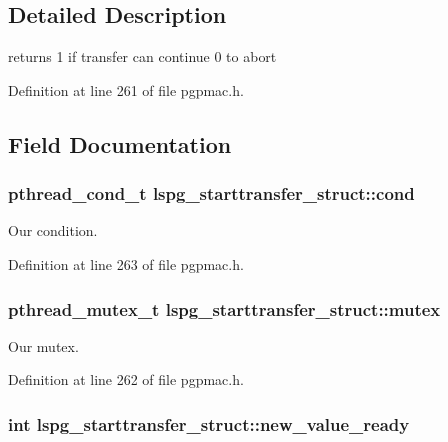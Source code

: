 \subsection{Detailed Description}
returns 1 if transfer can continue 0 to abort 

Definition at line 261 of file pgpmac.\-h.



\subsection{Field Documentation}
\hypertarget{structlspg__starttransfer__struct_a1a569a2afabd7910219ff9d2d48c1b38}{
\subsubsection[{cond}]{\setlength{\rightskip}{0pt plus 5cm}pthread\-\_\-cond\-\_\-t lspg\-\_\-starttransfer\-\_\-struct\-::cond}}\label{structlspg__starttransfer__struct_a1a569a2afabd7910219ff9d2d48c1b38}


Our condition. 



Definition at line 263 of file pgpmac.\-h.

\hypertarget{structlspg__starttransfer__struct_a47824bb2701a699d43a7a916e2010705}{
\subsubsection[{mutex}]{\setlength{\rightskip}{0pt plus 5cm}pthread\-\_\-mutex\-\_\-t lspg\-\_\-starttransfer\-\_\-struct\-::mutex}}\label{structlspg__starttransfer__struct_a47824bb2701a699d43a7a916e2010705}


Our mutex. 



Definition at line 262 of file pgpmac.\-h.

\hypertarget{structlspg__starttransfer__struct_ad3a6356e5ccce15c982ddecf9634999f}{
\subsubsection[{new\-\_\-value\-\_\-ready}]{\setlength{\rightskip}{0pt plus 5cm}int lspg\-\_\-starttransfer\-\_\-struct\-::new\-\_\-value\-\_\-ready}}\label{structlspg__starttransfer__struct_ad3a6356e5ccce15c982ddecf9634999f}


